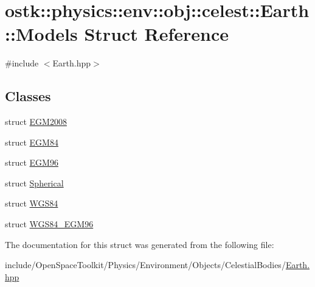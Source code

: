 \hypertarget{structostk_1_1physics_1_1env_1_1obj_1_1celest_1_1_earth_1_1_models}{}\section{ostk\+:\+:physics\+:\+:env\+:\+:obj\+:\+:celest\+:\+:Earth\+:\+:Models Struct Reference}
\label{structostk_1_1physics_1_1env_1_1obj_1_1celest_1_1_earth_1_1_models}


{\ttfamily \#include $<$Earth.\+hpp$>$}

\subsection*{Classes}
\begin{DoxyCompactItemize}
\item 
struct \hyperlink{structostk_1_1physics_1_1env_1_1obj_1_1celest_1_1_earth_1_1_models_1_1_e_g_m2008}{E\+G\+M2008}
\item 
struct \hyperlink{structostk_1_1physics_1_1env_1_1obj_1_1celest_1_1_earth_1_1_models_1_1_e_g_m84}{E\+G\+M84}
\item 
struct \hyperlink{structostk_1_1physics_1_1env_1_1obj_1_1celest_1_1_earth_1_1_models_1_1_e_g_m96}{E\+G\+M96}
\item 
struct \hyperlink{structostk_1_1physics_1_1env_1_1obj_1_1celest_1_1_earth_1_1_models_1_1_spherical}{Spherical}
\item 
struct \hyperlink{structostk_1_1physics_1_1env_1_1obj_1_1celest_1_1_earth_1_1_models_1_1_w_g_s84}{W\+G\+S84}
\item 
struct \hyperlink{structostk_1_1physics_1_1env_1_1obj_1_1celest_1_1_earth_1_1_models_1_1_w_g_s84___e_g_m96}{W\+G\+S84\+\_\+\+E\+G\+M96}
\end{DoxyCompactItemize}


The documentation for this struct was generated from the following file\+:\begin{DoxyCompactItemize}
\item 
include/\+Open\+Space\+Toolkit/\+Physics/\+Environment/\+Objects/\+Celestial\+Bodies/\hyperlink{_objects_2_celestial_bodies_2_earth_8hpp}{Earth.\+hpp}\end{DoxyCompactItemize}
